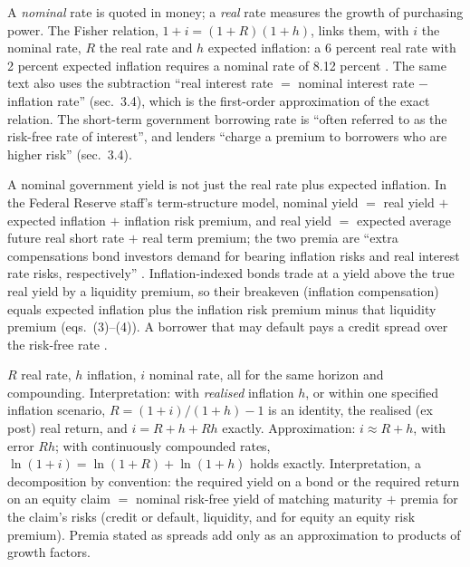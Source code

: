 \begin{qfdefinition}\label{def:required-return-components}
 A \emph{nominal} rate is quoted in money; a \emph{real} rate measures the growth of purchasing power. The Fisher relation, $1+i=(1+R)(1+h)$, links them, with $i$ the nominal rate, $R$ the real rate and $h$ expected inflation: a 6 percent real rate with 2 percent expected inflation requires a nominal rate of 8.12 percent \citep[sec.~7.4]{principles-of-finance-2026}. The same text also uses the subtraction ``real interest rate $=$ nominal interest rate $-$ inflation rate'' (sec.~3.4), which is the first-order approximation of the exact relation. The short-term government borrowing rate is ``often referred to as the risk-free rate of interest'', and lenders ``charge a premium to borrowers who are higher risk'' (sec.~3.4).

A nominal government yield is not just the real rate plus expected inflation. In the Federal Reserve staff's term-structure model, nominal yield $=$ real yield $+$ expected inflation $+$ inflation risk premium, and real yield $=$ expected average future real short rate $+$ real term premium; the two premia are ``extra compensations bond investors demand for bearing inflation risks and real interest rate risks, respectively'' \citep[eqs.~(1)--(2)]{inflation-compensation-decomposition-2019}. Inflation-indexed bonds trade at a yield above the true real yield by a liquidity premium, so their breakeven (inflation compensation) equals expected inflation plus the inflation risk premium minus that liquidity premium (eqs.~(3)--(4)). A borrower that may default pays a credit spread over the risk-free rate \citep[chap.~4, sec.~4.1, p.~98]{s7-hulloptions}.

 $R$ real rate, $h$ inflation, $i$ nominal rate, all for the same horizon and compounding. Interpretation: with \emph{realised} inflation $h$, or within one specified inflation scenario, $R=(1+i)/(1+h)-1$ is an identity, the realised (ex post) real return, and $i=R+h+Rh$ exactly. Approximation: $i\approx R+h$, with error $Rh$; with continuously compounded rates, $\ln(1+i)=\ln(1+R)+\ln(1+h)$ holds exactly. Interpretation, a decomposition by convention: the required yield on a bond or the required return on an equity claim $=$ nominal risk-free yield of matching maturity $+$ premia for the claim's risks (credit or default, liquidity, and for equity an equity risk premium). Premia stated as spreads add only as an approximation to products of growth factors.


\end{qfdefinition}
